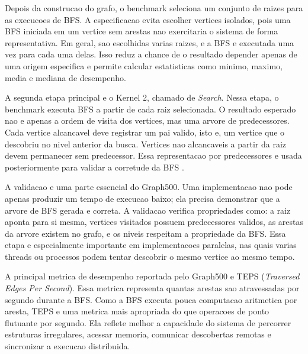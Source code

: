 \documentclass{article}
\begin{document}
Depois da construcao do grafo, o benchmark seleciona um conjunto de raizes para
as execucoes de BFS. A especificacao evita escolher vertices isolados, pois uma
BFS iniciada em um vertice sem arestas nao exercitaria o sistema de forma
representativa. Em geral, sao escolhidas varias raizes, e a BFS e executada uma
vez para cada uma delas. Isso reduz a chance de o resultado depender apenas de
uma origem especifica e permite calcular estatisticas como minimo, maximo, media
e mediana de desempenho.

A segunda etapa principal e o Kernel 2, chamado de \textit{Search}. Nessa etapa,
o benchmark executa BFS a partir de cada raiz selecionada. O resultado esperado
nao e apenas a ordem de visita dos vertices, mas uma arvore de predecessores.
Cada vertice alcancavel deve registrar um pai valido, isto e, um vertice que o
descobriu no nivel anterior da busca. Vertices nao alcancaveis a partir da raiz
devem permanecer sem predecessor. Essa representacao por predecessores e usada
posteriormente para validar a corretude da BFS \cite{graph500spec}.

A validacao e uma parte essencial do Graph500. Uma implementacao nao pode apenas
produzir um tempo de execucao baixo; ela precisa demonstrar que a arvore de BFS
gerada e correta. A validacao verifica propriedades como: a raiz aponta para si
mesma, vertices visitados possuem predecessores validos, as arestas da arvore
existem no grafo, e os niveis respeitam a propriedade da BFS. Essa etapa e
especialmente importante em implementacoes paralelas, nas quais varias threads
ou processos podem tentar descobrir o mesmo vertice ao mesmo tempo.

A principal metrica de desempenho reportada pelo Graph500 e TEPS
(\textit{Traversed Edges Per Second}). Essa metrica representa quantas arestas
sao atravessadas por segundo durante a BFS. Como a BFS executa pouca computacao
aritmetica por aresta, TEPS e uma metrica mais apropriada do que operacoes de
ponto flutuante por segundo. Ela reflete melhor a capacidade do sistema de
percorrer estruturas irregulares, acessar memoria, comunicar descobertas remotas
e sincronizar a execucao distribuida.



\end{document}
